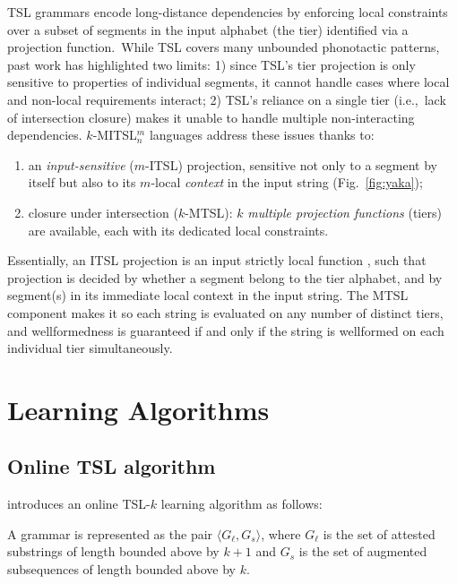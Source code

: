 \documentclass[11pt]{article}
\begin{document}
TSL grammars encode long-distance dependencies by enforcing local constraints over a subset of segments in the input alphabet (the tier) identified via a projection function.\
While TSL covers many unbounded phonotactic patterns, past work has highlighted two limits: 1) since TSL's tier projection is only sensitive to properties of individual segments, it cannot handle cases where local and non-local requirements interact; 2) TSL's  reliance on a single tier (i.e.,\ lack of intersection closure) makes it unable to handle multiple non-interacting dependencies.\@
$k$-MITSL$^m_n$ languages \citep[$n$ being the size of the tier constraints;][]{de2019structure} address these issues thanks to:\
\begin{enumerate}
\item an \emph{input-sensitive} ($m$-ITSL) projection, sensitive not only to a segment by itself but also to its $m$-local \emph{context} in the input string (Fig.\ \ref{fig:yaka}); 
\item closure under intersection ($k$-MTSL): $k$ \emph{multiple projection functions} (tiers) are available, each with its dedicated local constraints.
\end{enumerate}

Essentially, an ITSL projection is an input strictly local function \cite{ChandleeHeinz18}, such that projection is decided by whether a segment belong to the tier alphabet, and by segment(s) in its immediate local context in the input string.\@
The MTSL component makes it so each string is evaluated on any number of distinct tiers, and wellformedness is guaranteed if and only if the string is wellformed on each individual tier simultaneously.

\section{Learning Algorithms}
\subsection{Online TSL algorithm \cite{pmlr-v153-lambert21a}}
    \citet{pmlr-v153-lambert21a} introduces an online TSL-$k$ learning algorithm as follows:

    A grammar is represented as the pair $\langle  G_{\ell}, G_s \rangle$, where $G_{\ell}$ is the set of attested substrings of length bounded above by $k+1$ and $G_s$ is the set of augmented subsequences of length bounded above by $k$.
        
\end{document}
